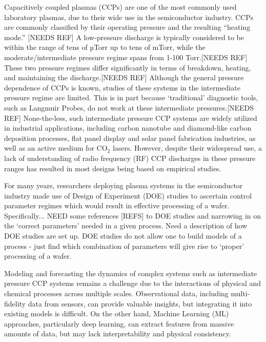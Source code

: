 \documentclass[12pt]{iopart}
\begin{document}
Capacitively coupled plasmas (CCPs) are one of the most commonly used laboratory plasmas, due to their wide use in the semiconductor industry.  CCPs are commonly classified by their operating pressure and the resulting ``heating mode.'' [NEEDS REF] A low-pressure discharge is typically considered to be within the range of tens of µTorr up to tens of mTorr, while the moderate/intermediate pressure regime spans from 1-100 Torr.[NEEDS REF] These two pressure regimes differ significantly in terms of breakdown, heating, and maintaining the discharge.[NEEDS REF] Although the general pressure dependence of CCPs is known, studies of these systems in the intermediate pressure regime are limited.  This is in part because `traditional' diagnostic tools, such as Langmuir Probes, do not work at these intermediate pressures.[NEEDS REF]  None-the-less, such intermediate pressure CCP systems are widely utilized in industrial applications, including carbon nanotube and diamond-like carbon deposition processes, flat panel display and solar panel fabrication industries, as well as an active medium for CO$_2$ lasers. However, despite their widespread use, a lack of understanding of radio frequency (RF) CCP discharges in these pressure ranges has resulted in most designs being based on empirical studies.

For many years, researchers deploying plasma systems in the semiconductor industry made use of Design of Experiment (DOE) studies to ascertain control parameter regimes which would result in effective processing of a wafer.   Specifically... NEED some references [REFS] to DOE studies and narrowing in on the `correct parameters' needed in a given process.   Need a description of how DOE studies are set up.  DOE studies do not allow one to build models of a process - just find which combination of parameters will give rise to `proper' processing of a wafer.

Modeling and forecasting the dynamics of complex systems such as intermediate pressure CCP systems remains a challenge due to the interactions of physical and chemical processes across multiple scales. Observational data, including multi-fidelity data from sensors, can provide valuable insights, but integrating it into existing models is difficult. On the other hand, Machine Learning (ML) approaches, particularly deep learning, can extract features from massive amounts of data, but may lack interpretability and physical consistency.
\end{document}

